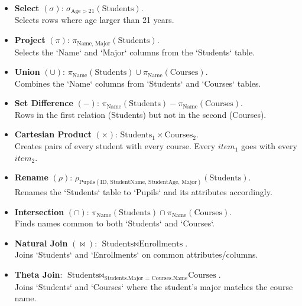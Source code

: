 \begin{itemize}[noitemsep,leftmargin=*]
\leftskip-\dimexpr\leftmargin %

\item[]{\textbf{Select} $(\sigma)$:
$\sigma_{\text{Age} > 21}(\text{Students})$. \\
Selects rows where age larger than 21 years.}

\item[]{\textbf{Project} $(\pi)$:
$\pi_{\text{Name, Major}}(\text{Students})$. \\
Selects the `Name` and `Major` columns from the `Students` table.}

\item[]{\textbf{Union} $(\cup)$:
$\pi_{\text{Name}}(\text{Students}) \cup \pi_{\text{Name}}(\text{Courses})$. \\
Combines the `Name` columns from `Students` and `Courses` tables.}

\item[]{\textbf{Set Difference} $(-)$:
$\pi_{\text{Name}}(\text{Students}) - \pi_{\text{Name}}(\text{Courses})$. \\
Rows in the first relation (Students) but not in the second (Courses).}

\item[]{\textbf{Cartesian Product} $(\times)$:
$\text{Students}_1 \times \text{Courses}_2$. \\
Creates pairs of every student with every course. Every $item_1$ goes with every $item_2$.}

\item[]{\textbf{Rename} $(\rho)$:
$\rho_{\text{Pupils}(\text{ID, StudentName, StudentAge, Major})}(\text{Students})$. \\
Renames the `Students` table to `Pupils` and its attributes accordingly.}

\item[]{\textbf{Intersection} $(\cap)$:
$\pi_{\text{Name}}(\text{Students}) \cap \pi_{\text{Name}}(\text{Courses})$. \\
Finds names common to both `Students` and `Courses`.}

\item[]{\textbf{Natural Join} $(\bowtie)$:
$\text{Students} \bowtie \text{Enrollments}$. \\
Joins `Students` and `Enrollments` on common attributes/columns.}

\item[]{\textbf{Theta Join}:
$\text{Students} \bowtie_{\text{Students.Major = Courses.Name}} \text{Courses}$. \\
Joins `Students` and `Courses` where the student's major matches the course name.}


\end{itemize}
